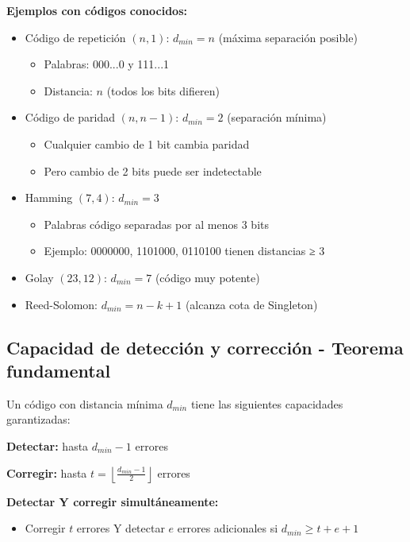 \documentclass[10pt,a4paper]{article}
\begin{document}
\textbf{Ejemplos con códigos conocidos:}
\begin{itemize}
\item Código de repetición $(n,1)$: $d_{min} = n$ (máxima separación posible)
  \begin{itemize}
  \item Palabras: 000...0 y 111...1
  \item Distancia: $n$ (todos los bits difieren)
  \end{itemize}
\item Código de paridad $(n, n-1)$: $d_{min} = 2$ (separación mínima)
  \begin{itemize}
  \item Cualquier cambio de 1 bit cambia paridad
  \item Pero cambio de 2 bits puede ser indetectable
  \end{itemize}
\item Hamming $(7,4)$: $d_{min} = 3$
  \begin{itemize}
  \item Palabras código separadas por al menos 3 bits
  \item Ejemplo: 0000000, 1101000, 0110100 tienen distancias ≥ 3
  \end{itemize}
\item Golay $(23,12)$: $d_{min} = 7$ (código muy potente)
\item Reed-Solomon: $d_{min} = n - k + 1$ (alcanza cota de Singleton)
\end{itemize}

\subsection{Capacidad de detección y corrección - Teorema fundamental}

\begin{tcolorbox}[colback=azulclaro!10,colframe=azuloscuro,title=⚡ TEOREMA FUNDAMENTAL DE LA CODIFICACIÓN]
Un código con distancia mínima $d_{min}$ tiene las siguientes capacidades garantizadas:

\textbf{Detectar:} hasta $\boxed{d_{min} - 1}$ errores

\textbf{Corregir:} hasta $\boxed{t = \left\lfloor \frac{d_{min}-1}{2} \right\rfloor}$ errores

\textbf{Detectar Y corregir simultáneamente:}
\begin{itemize}
\item Corregir $t$ errores Y detectar $e$ errores adicionales si $d_{min} \geq t + e + 1$
\end{itemize}
\end{tcolorbox}
\end{document}
